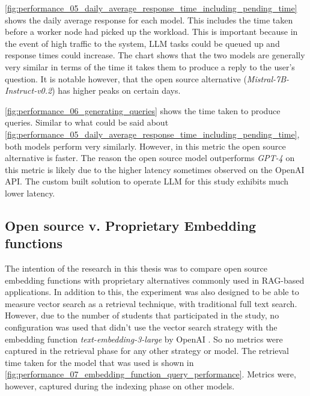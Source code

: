 \autoref{fig:performance_05_daily_average_response_time_including_pending_time} shows the daily average response for each model. This includes the time taken before a worker node had picked up the workload. This is important because in the event of high traffic to the system, \gls{LLM} tasks could be queued up and response times could increase. The chart shows that the two models are generally very similar in terms of the time it takes them to produce a reply to the user's question. It is notable however, that the open source alternative (\textit{Mistral-7B-Instruct-v0.2}) has higher peaks on certain days.





\autoref{fig:performance_06_generating_queries} shows the time taken to produce queries. Similar to what could be said about \autoref{fig:performance_05_daily_average_response_time_including_pending_time}, both models perform very similarly. However, in this metric the open source alternative is faster. The reason the open source model outperforms \textit{GPT-4} on this metric is likely due to the higher latency sometimes observed on the OpenAI API. The custom built solution to operate \gls{LLM} for this study exhibits much lower latency.





\subsection{Open source v. Proprietary Embedding functions}


The intention of the research in this thesis was to compare open source embedding functions with proprietary alternatives commonly used in \gls{RAG}-based applications. In addition to this, the experiment was also designed to be able to measure vector search as a retrieval technique, with traditional full text search. However, due to the number of students that participated in the study, no configuration was used that didn’t use the vector search strategy with the embedding function \textit{text-embedding-3-large} by OpenAI \cite{openai_new_2024}. So no metrics were captured in the retrieval phase for any other strategy or model. The retrieval time taken for the model that was used is shown in \autoref{fig:performance_07_embedding_function_query_performance}. Metrics were, however, captured during the indexing phase on other models.


